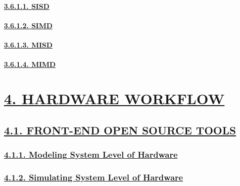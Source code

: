 \documentclass[
]{article}
\begin{document}
\hypertarget{sisd}{%
\paragraph{\texorpdfstring{\protect\hyperlink{sisd-1}{3.6.1.1.
SISD}}{3.6.1.1. SISD}}\label{sisd}}

\hypertarget{simd}{%
\paragraph{\texorpdfstring{\protect\hyperlink{simd-1}{3.6.1.2.
SIMD}}{3.6.1.2. SIMD}}\label{simd}}

\hypertarget{misd}{%
\paragraph{\texorpdfstring{\protect\hyperlink{misd-1}{3.6.1.3.
MISD}}{3.6.1.3. MISD}}\label{misd}}

\hypertarget{mimd}{%
\paragraph{\texorpdfstring{\protect\hyperlink{mimd-1}{3.6.1.4.
MIMD}}{3.6.1.4. MIMD}}\label{mimd}}

\hypertarget{hardware-workflow}{%
\section{\texorpdfstring{\protect\hyperlink{hardware-workflow-1}{4.
HARDWARE WORKFLOW}}{4. HARDWARE WORKFLOW}}\label{hardware-workflow}}

\hypertarget{front-end-open-source-tools}{%
\subsection{\texorpdfstring{\protect\hyperlink{front-end-open-source-tools-2}{4.1.
FRONT-END OPEN SOURCE
TOOLS}}{4.1. FRONT-END OPEN SOURCE TOOLS}}\label{front-end-open-source-tools}}

\hypertarget{modeling-system-level-of-hardware}{%
\subsubsection{\texorpdfstring{\protect\hyperlink{modeling-system-level-of-hardware-1}{4.1.1.
Modeling System Level of
Hardware}}{4.1.1. Modeling System Level of Hardware}}\label{modeling-system-level-of-hardware}}

\hypertarget{simulating-system-level-of-hardware}{%
\subsubsection{\texorpdfstring{\protect\hyperlink{simulating-system-level-of-hardware-1}{4.1.2.
Simulating System Level of
Hardware}}{4.1.2. Simulating System Level of Hardware}}\label{simulating-system-level-of-hardware}}
\end{document}

